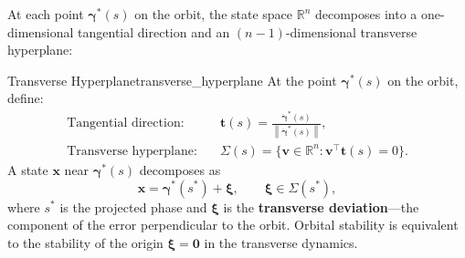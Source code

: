 \documentclass[12pt, openany]{book}
\theoremstyle{plain}
\newcommand{\state}{\bm{x}}
\newcommand{\traj}{\bm{\gamma}}
\newcommand{\Reals}{\mathbb{R}}
\newcommand{\norm}[1]{\left\lVert #1 \right\rVert}
\begin{document}
At each point $\traj^*(s)$ on the orbit, the state space $\Reals^n$
decomposes into a one-dimensional tangential direction and an
$(n{-}1)$-dimensional transverse hyperplane:

\begin{definition}{Transverse Hyperplane}{transverse_hyperplane}
  At the point $\traj^*(s)$ on the orbit, define:
  \begin{align}
    \text{Tangential direction:} &\quad
      \bm{t}(s) = \frac{\dot{\traj}^*(s)}{\norm{\dot{\traj}^*(s)}}, \\
    \text{Transverse hyperplane:} &\quad
      \Sigma(s) = \{\bm{v} \in \Reals^n : \bm{v}^\top \bm{t}(s) = 0\}.
  \end{align}
  A state $\state$ near $\traj^*(s)$ decomposes as
  \begin{equation}\label{eq:decomposition}
    \state = \traj^*(s^*) + \bm{\xi}, \qquad
    \bm{\xi} \in \Sigma(s^*),
  \end{equation}
  where $s^*$ is the projected phase and $\bm{\xi}$ is the \textbf{transverse
  deviation}---the component of the error perpendicular to the orbit. Orbital
  stability is equivalent to the stability of the origin $\bm{\xi} = \bm{0}$
  in the transverse dynamics.
\end{definition}
\end{document}
